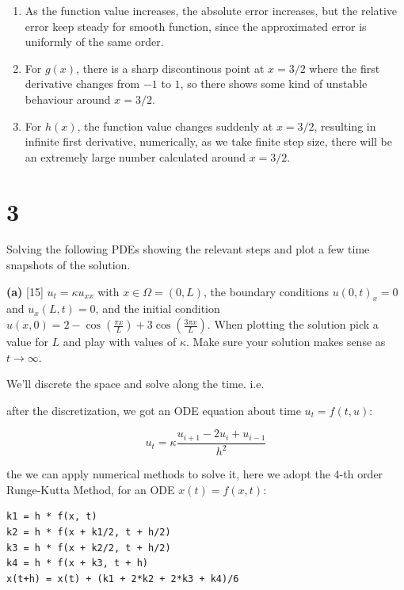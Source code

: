 \documentclass[11pt]{article}
\providecommand{\tightlist}{%
      \setlength{\itemsep}{0pt}\setlength{\parskip}{0pt}}
\begin{document}
\begin{enumerate}
\def\labelenumi{\arabic{enumi}.}
\tightlist
\item
  As the function value increases, the absolute error increases, but the
  relative error keep steady for smooth function, since the approximated
  error is uniformly of the same order.
\item
  For \(g(x)\), there is a sharp discontinous point at \(x=3/2\) where
  the first derivative changes from \(-1\) to \(1\), so there shows some
  kind of unstable behaviour around \(x=3/2\).
\item
  For \(h(x)\), the function value changes suddenly at \(x=3/2\),
  resulting in infinite first derivative, numerically, as we take finite
  step size, there will be an extremely large number calculated around
  \(x=3/2\).
\end{enumerate}

    \hypertarget{section}{%
\section{3}\label{section}}

Solving the following PDEs showing the relevant steps and plot a few
time snapshots of the solution.

    \textbf{(a)} {[}15{]} \(u_t = \kappa u_{xx}\) with
\(x \in \Omega = (0, L)\), the boundary conditions \(u(0, t)_x = 0\) and
\(u_x(L, t) = 0\), and the initial condition
\(u(x, 0) = 2 - \cos\left(\frac{\pi x}{L} \right) + 3 \cos\left(\frac{3 \pi x}{L} \right)\).
When plotting the solution pick a value for \(L\) and play with values
of \(\kappa\). Make sure your solution makes sense as
\(t \rightarrow \infty\).

    We'll discrete the space and solve along the time. i.e.~

after the discretization, we got an ODE equation about time
\(u_t=f(t,u)\):

\[u_t=\kappa \dfrac{u_{i+1}-2u_i+u_{i-1}}{h^2}\]

the we can apply numerical methods to solve it, here we adopt the 4-th
order Runge-Kutta Method, for an ODE \(x(t) = f(x,t)\):

\begin{verbatim}
k1 = h * f(x, t)
k2 = h * f(x + k1/2, t + h/2)
k3 = h * f(x + k2/2, t + h/2)
k4 = h * f(x + k3, t + h)
x(t+h) = x(t) + (k1 + 2*k2 + 2*k3 + k4)/6
\end{verbatim}
\end{document}
